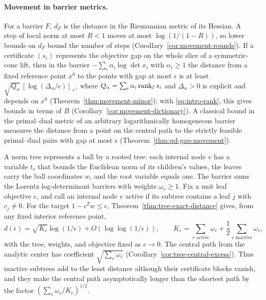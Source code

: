 \paragraph{Movement in barrier metrics.}
For a barrier $F$, $d_F$ is the distance in the Riemannian metric of its
Hessian. A step of local norm at most $R<1$ moves at most
$\log(1/(1-R))$, so lower bounds on $d_F$ bound the number of steps
(Corollary~\ref{cor:movement-rounds}). If a certificate $(s_i)$
represents the objective gap on the whole slice of a symmetric-cone
lift, then in the barrier $-\sum_i\alpha_i\log\det x_i$ with
$\alpha_i\geq1$ the distance from a fixed reference point $x^0$ to the
points with gap at most $\epsilon$ is at least
$\sqrt{Q_\alpha}\,[\log(\Delta_\alpha/\epsilon)]_+$, where
$Q_\alpha=\sum_i\alpha_i\operatorname{rank}_{\!J} s_i$ and $\Delta_\alpha>0$ is explicit
and depends on $x^0$ (Theorem~\ref{thm:movement-minor}); with \eqref{eq:intro-rank}, this
gives bounds in terms of $B$ (Corollary~\ref{cor:movement-dictionary}).
A classical bound in the primal--dual metric of an arbitrary
logarithmically homogeneous barrier measures the distance from a point
on the central path to the strictly feasible primal--dual pairs with
gap at most $\epsilon$ (Theorem~\ref{thm:pd-gap-movement}).

A norm tree represents a ball by a rooted tree: each internal node $v$
has a variable $t_v$ that bounds the Euclidean norm of its children's
values, the leaves carry the ball coordinates $w$, and the root variable
equals one. The barrier sums the Lorentz log-determinant barriers with
weights $\omega_v\geq1$. Fix a unit leaf objective $c$, and call an
internal node $v$ active if its subtree contains a leaf $j$ with
$c_j\neq0$. For the target $1-c^Tw\leq\epsilon$,
Theorem~\ref{thm:tree-exact-distance} gives, from any fixed interior
reference point,
\begin{equation}\label{eq:intro-tree}
 d(\epsilon)=\sqrt{K_c}\log(1/\epsilon)
              +O(\log\log(1/\epsilon)),\qquad
 K_c=\sum_{v\text{ active}}\omega_v
                  +\frac12\sum_{v\text{ inactive}}\omega_v,
\end{equation}
with the tree, weights, and objective fixed as $\epsilon\to0$. The
central path from the analytic center has coefficient
$\sqrt{\sum_v\omega_v}$ (Corollary~\ref{cor:tree-central-excess}). Thus
inactive subtrees add to the least distance although their certificate
blocks vanish, and they make the central path asymptotically longer than
the shortest path by the factor $(\sum_v\omega_v/K_c)^{1/2}$.

